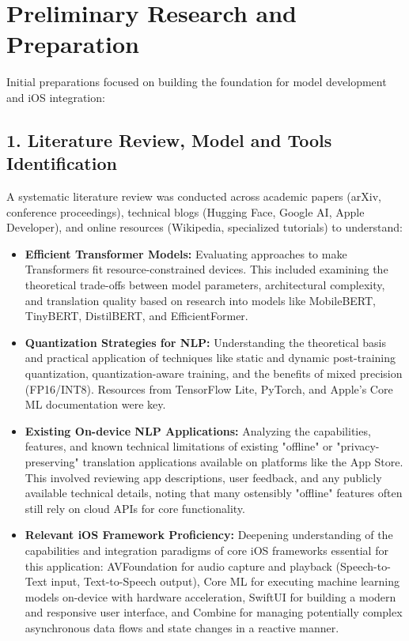 \documentclass[12pt]{article}
\begin{document}
\section{Preliminary Research and Preparation} %

Initial preparations focused on building the foundation for model development and iOS integration:

\subsection*{1. Literature Review, Model and Tools Identification}
A systematic literature review was conducted across academic papers (arXiv, conference proceedings), technical blogs (Hugging Face, Google AI, Apple Developer), and online resources (Wikipedia, specialized tutorials) to understand:
\begin{itemize}
    \item \textbf{Efficient Transformer Models:} Evaluating approaches to make Transformers fit resource-constrained devices. This included examining the theoretical trade-offs between model parameters, architectural complexity, and translation quality based on research into models like MobileBERT, TinyBERT, DistilBERT, and EfficientFormer.
    \item \textbf{Quantization Strategies for NLP:} Understanding the theoretical basis and practical application of techniques like static and dynamic post-training quantization, quantization-aware training, and the benefits of mixed precision (FP16/INT8). Resources from TensorFlow Lite, PyTorch, and Apple's Core ML documentation were key.
    \item \textbf{Existing On-device NLP Applications:} Analyzing the capabilities, features, and known technical limitations of existing "offline" or "privacy-preserving" translation applications available on platforms like the App Store. This involved reviewing app descriptions, user feedback, and any publicly available technical details, noting that many ostensibly "offline" features often still rely on cloud APIs for core functionality.
    \item \textbf{Relevant iOS Framework Proficiency:} Deepening understanding of the capabilities and integration paradigms of core iOS frameworks essential for this application: AVFoundation for audio capture and playback (Speech-to-Text input, Text-to-Speech output), Core ML for executing machine learning models on-device with hardware acceleration, SwiftUI for building a modern and responsive user interface, and Combine for managing potentially complex asynchronous data flows and state changes in a reactive manner.
\end{itemize}
\end{document}
